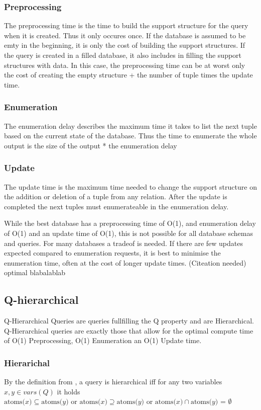 \documentclass[abstracton,12pt]{scrreprt}
\begin{document}
\subsubsection{Preprocessing}
The preprocessing time is the time to build the support structure for the query when it is created. Thus it only occures once. If the database is assumed to be emty in the beginning, it is only the cost of building the support structures. If the query is created in a filled database, it also includes in filling the support structures with data. In this case, the preprocessing time can be at worst only the cost of creating the empty structure + the number of tuple times the update time.

\subsubsection{Enumeration}
The enumeration delay describes the maximum time it takes to list the next tuple based on the current state of the database. Thus the time to enumerate the whole output is the size of the output * the enumeration delay

\subsubsection{Update}
The update time is the maximum time needed to change the support structure on the addition or deletion of a tuple from any relation. After the update is completed the next tuples must enumerateable in the enumeration delay.

While the best database has a preprocessing time of O(1), and enumeration delay of O(1) and an update time of O(1), this is not possible for all database schemas and queries. For many databases a tradeof is needed. If there are few updates expected compared to enumeration requests, it is best to minimise the enumeration time, often at the cost of longer update times. (Citeation needed) optimal blabalablab

\subsection{Q-hierarchical}
Q-Hierarchical Queries are queries fullfilling the Q property and are Hierarchical. Q-Hierarchical queries are exactly those that allow for the optimal compute time of O(1) Preprocessing, O(1) Enumeration an O(1) Update time.

\subsubsection{Hierarichal}
By the definition from \cite{AnsweringConjunctiveQueriesUpdates}, a query is hierarchical iff for any two variables $ x, y \in vars(Q)$ it holds
$\text{atoms(}x\text{)} \subseteq \text{atoms(}y\text{) or atoms(}x\text{)} \supseteq \text{atoms(}y\text{) or atoms(}x\text{)} \cap \text{atoms(}y\text{) = }  \emptyset$
\end{document}
